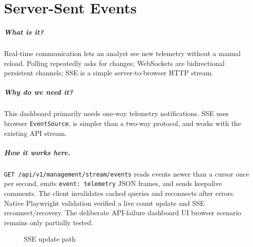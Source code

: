 \documentclass[11pt,oneside]{book}
\newcommand{\what}[1]{\paragraph{What is it?}#1}
\newcommand{\why}[1]{\paragraph{Why do we need it?}#1}
\newcommand{\how}[1]{\paragraph{How it works here.}#1}
\begin{document}
\chapter{Server-Sent Events}
\what{Real-time communication lets an analyst see new telemetry without a manual reload. Polling repeatedly asks for changes; WebSockets are bidirectional persistent channels; SSE is a simple server-to-browser HTTP stream.}\why{This dashboard primarily needs one-way telemetry notifications. SSE uses browser \texttt{EventSource}, is simpler than a two-way protocol, and works with the existing API stream.}\how{\texttt{GET /api/v1/management/stream/events} reads events newer than a cursor once per second, emits \texttt{event: telemetry} JSON frames, and sends keepalive comments. The client invalidates cached queries and reconnects after errors. Native Playwright validation verified a live count update and SSE reconnect/recovery. The deliberate API-failure dashboard UI browser scenario remains only partially tested.}
\begin{figure}[h]\centering{}\caption{SSE update path}\end{figure}
\end{document}
